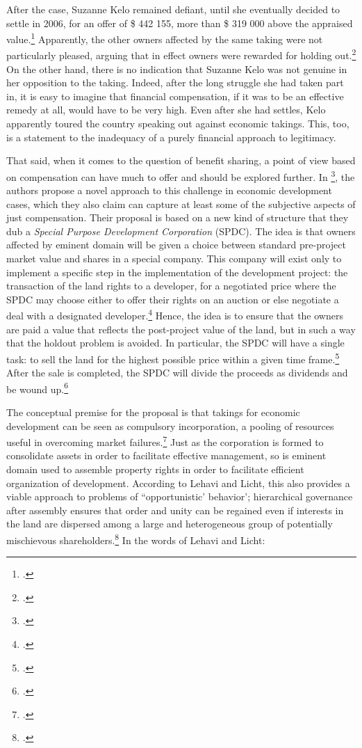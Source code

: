 After the case, Suzanne Kelo remained defiant, until she eventually decided to settle in 2006, for an offer of \$ 442 155, more than \$ 319 000 above the appraised value.\footcite[1709]{lehavi07} Apparently, the other owners affected by the same taking were not particularly pleased, arguing that in effect owners were rewarded for holding out.\footcite[1709]{lehavi07} On the other hand, there is no indication that Suzanne Kelo was not genuine in her opposition to the taking. Indeed, after the long struggle she had taken part in, it is easy to imagine that financial compensation, if it was to be an effective remedy at all, would have to be very high. Even after she had settles, Kelo apparently toured the country speaking out against economic takings. This, too, is a statement to the inadequacy of a purely financial approach to legitimacy. 

That said, when it comes to the question of benefit sharing, a point of view based on compensation can have much to offer and should be explored further. In \footcite{lehavi07}, the authors propose a novel approach to this challenge in economic development cases, which they also claim can capture at least some of the subjective aspects of just compensation. Their proposal is based on a new kind of structure that they dub a {\it Special Purpose Development Corporation} (SPDC). The idea is that owners affected by eminent domain will be given a choice between standard pre-project market value and shares in a special company. This company will exist only to implement a specific step in the implementation of the development project: the transaction of the land rights to a developer, for a negotiated price where the SPDC may choose either to offer their rights on an auction or else negotiate a deal with a designated developer.\footcite[1735]{lehavi07} Hence, the idea is to ensure that the owners are paid a value that reflects the post-project value of the land, but in such a way that the holdout problem is avoided. In particular, the SPDC will have a single task: to sell the land for the highest possible price within a given time frame.\footcite[1741]{lehavi07} After the sale is completed, the SPDC will divide the proceeds as dividends and be wound up.\footcite[1741]{lehavi07}

The conceptual premise for the proposal is that takings for economic development can be seen as compulsory incorporation, a pooling of resources useful in overcoming market failures.\footcite[1732-1733]{lehavi07} Just as the corporation is formed to consolidate assets in order to facilitate effective management, so is eminent domain used to assemble property rights in order to facilitate efficient organization of development. According to Lehavi and Licht, this also provides a viable approach to problems of ``opportunistic' behavior'; hierarchical governance after assembly ensures that order and unity can be regained even if interests in the land are dispersed among a large and heterogeneous group of potentially mischievous shareholders.\footcite[1733]{lehavi07} In the words of Lehavi and Licht:

